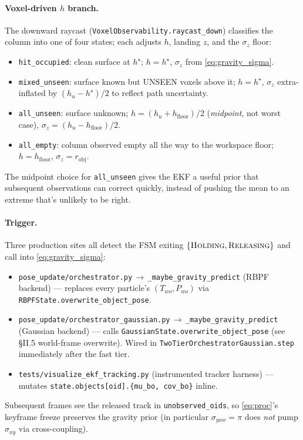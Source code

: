 \documentclass[11pt]{article}
\newcommand{\file}[1]{\texttt{#1}}
\begin{document}
\paragraph{Voxel-driven $h$ branch.}
The downward raycast (\texttt{VoxelObservability.raycast\_down})
classifies the column into one of four states; each adjusts $h$,
landing $z$, and the $\sigma_z$ floor:
\begin{itemize}[leftmargin=1.5em,itemsep=0pt,topsep=2pt]
\item \texttt{hit\_occupied}: clean surface at $h^\star$;
  $h = h^\star$, $\sigma_z$ from \eqref{eq:gravity_sigma}.
\item \texttt{mixed\_unseen}: surface known but UNSEEN voxels above
  it; $h = h^\star$, $\sigma_z$ extra-inflated by
  $(h_u - h^\star)/2$ to reflect path uncertainty.
\item \texttt{all\_unseen}: surface unknown;
  $h = (h_u + h_{\text{floor}})/2$ (\emph{midpoint}, not worst case),
  $\sigma_z = (h_u - h_{\text{floor}})/2$.
\item \texttt{all\_empty}: column observed empty all the way to the
  workspace floor; $h = h_{\text{floor}}$,
  $\sigma_z = r_{\text{obj}}$.
\end{itemize}
The midpoint choice for \texttt{all\_unseen} gives the EKF a useful
prior that subsequent observations can correct quickly, instead of
pushing the mean to an extreme that's unlikely to be right.

\paragraph{Trigger.}
Three production sites all detect the FSM exiting
$\{\textsc{Holding},\textsc{Releasing}\}$ and call into
\eqref{eq:gravity_sigma}:
\begin{itemize}[leftmargin=1.5em,itemsep=0pt,topsep=2pt]
\item \file{pose\_update/orchestrator.py}\,$\to$\,\texttt{\_maybe\_gravity\_predict} (RBPF backend) — replaces every particle's $(T_{wo}, P_{wo})$ via \texttt{RBPFState.overwrite\_object\_pose}.
\item \file{pose\_update/orchestrator\_gaussian.py}\,$\to$\,\texttt{\_maybe\_gravity\_predict} (Gaussian backend) — calls \texttt{GaussianState.overwrite\_object\_pose} (see §II.5 world-frame overwrite). Wired in \texttt{TwoTierOrchestratorGaussian.step} immediately after the fast tier.
\item \file{tests/visualize\_ekf\_tracking.py} (instrumented tracker harness) — mutates \texttt{state.objects[oid].\{mu\_bo, cov\_bo\}} inline.
\end{itemize}
Subsequent frames see the released track in
\texttt{unobserved\_oids}, so \eqref{eq:proc}'s keyframe freeze
preserves the gravity prior (in particular $\sigma_{yaw}=\pi$ does
\emph{not} pump $\sigma_{xy}$ via cross-coupling).
\end{document}
